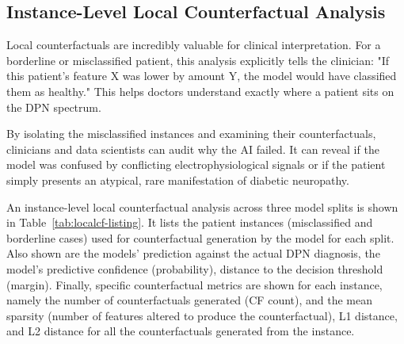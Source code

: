\documentclass[fleqn,10pt]{wlscirep}
\begin{document}
\subsection*{Instance-Level Local Counterfactual Analysis}
Local  counterfactuals are incredibly valuable for clinical interpretation. For a borderline or misclassified patient, this analysis explicitly tells the clinician: "If this patient's feature X was lower by amount Y, the model would have classified them as healthy." This helps doctors understand exactly where a patient sits on the DPN spectrum.

By isolating the misclassified instances and examining their counterfactuals, clinicians and data scientists can audit why the AI failed. It can reveal if the model was confused by conflicting electrophysiological signals or if the patient simply presents an atypical, rare manifestation of diabetic neuropathy.

An instance-level local counterfactual analysis across three model splits is shown in Table~\ref{tab:localcf-listing}. It lists the patient instances (misclassified and borderline cases) used for counterfactual generation by the model for each split. Also shown are the models' prediction against the actual DPN diagnosis,  the model's predictive confidence (probability), distance to the decision threshold (margin). Finally, specific counterfactual metrics are shown for each instance, namely the number of counterfactuals generated (CF count), and the mean sparsity (number of features altered to produce the counterfactual), L1 distance, and L2 distance for all the counterfactuals generated from the instance. 
\end{document}
